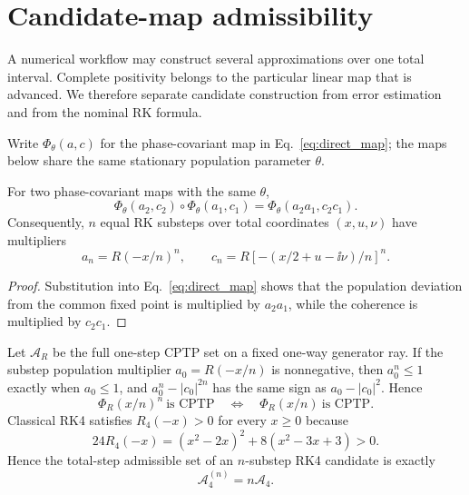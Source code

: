 \section{Candidate-map admissibility}
\label{sec:candidates}

A numerical workflow may construct several approximations over one total interval. Complete positivity belongs to the particular linear map that is advanced. We therefore separate candidate construction from error estimation and from the nominal RK formula.

Write $\Phi_\theta(a,c)$ for the phase-covariant map in Eq.~\eqref{eq:direct_map}; the maps below share the same stationary population parameter $\theta$.

\begin{proposition}
\label{prop:composition_calculus}
For two phase-covariant maps with the same $\theta$,
\begin{equation}
 \Phi_\theta(a_2,c_2)\circ\Phi_\theta(a_1,c_1)
 =\Phi_\theta(a_2a_1,c_2c_1).
 \label{eq:composition_calculus}
\end{equation}
Consequently, $n$ equal RK substeps over total coordinates $(x,u,\nu)$ have multipliers
\begin{equation}
 a_n=R(-x/n)^n,
 \qquad
 c_n=R[-(x/2+u-\ii\nu)/n]^n.
 \label{eq:n_substep_multipliers}
\end{equation}
\end{proposition}

\begin{proof}
Substitution into Eq.~\eqref{eq:direct_map} shows that the population deviation from the common fixed point is multiplied by $a_2a_1$, while the coherence is multiplied by $c_2c_1$.
\end{proof}

Let $\mathcal A_R$ be the full one-step CPTP set on a fixed one-way generator ray. If the substep population multiplier $a_0=R(-x/n)$ is nonnegative, then $a_0^n\le1$ exactly when $a_0\le1$, and $a_0^n-|c_0|^{2n}$ has the same sign as $a_0-|c_0|^2$. Hence
\begin{equation}
 \Phi_R(x/n)^n\ \text{is CPTP}
 \quad\Longleftrightarrow\quad
 \Phi_R(x/n)\ \text{is CPTP}.
 \label{eq:no_repair_substep}
\end{equation}
Classical RK4 satisfies $R_4(-x)>0$ for every $x\ge0$ because
\begin{equation}
 24R_4(-x)=(x^2-2x)^2+8(x^2-3x+3)>0.
\end{equation}
Hence the total-step admissible set of an $n$-substep RK4 candidate is exactly
\begin{equation}
 \mathcal A_4^{(n)}=n\mathcal A_4.
 \label{eq:dilated_candidate_set}
\end{equation}

